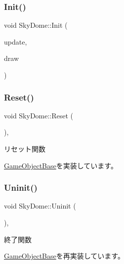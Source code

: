 \subsubsection{\texorpdfstring{Init()}{Init()}}
{\footnotesize\ttfamily void Sky\+Dome\+::\+Init (\begin{DoxyParamCaption}\item[{\mbox{\hyperlink{class_update_base}{Update\+Base}} $\ast$}]{update,  }\item[{\mbox{\hyperlink{class_draw_base}{Draw\+Base}} $\ast$}]{draw }\end{DoxyParamCaption})}

\mbox{\label{class_sky_dome_abc6f8ed1471d7b03f25924a849cae590}} 
\subsubsection{\texorpdfstring{Reset()}{Reset()}}
{\footnotesize\ttfamily void Sky\+Dome\+::\+Reset (\begin{DoxyParamCaption}{ }\end{DoxyParamCaption})\hspace{0.3cm}{\ttfamily [override]}, {\ttfamily [virtual]}}



リセット関数 



\mbox{\hyperlink{class_game_object_base_a85c59554f734bcb09f1a1e18d9517dce}{Game\+Object\+Base}}を実装しています。

\mbox{\label{class_sky_dome_a7fc71bfa671cf6e7ab26a194459b0753}} 
\subsubsection{\texorpdfstring{Uninit()}{Uninit()}}
{\footnotesize\ttfamily void Sky\+Dome\+::\+Uninit (\begin{DoxyParamCaption}{ }\end{DoxyParamCaption})\hspace{0.3cm}{\ttfamily [override]}, {\ttfamily [virtual]}}



終了関数 



\mbox{\hyperlink{class_game_object_base_a97e1bc277d7b1c0156d4735de29a022c}{Game\+Object\+Base}}を再実装しています。



